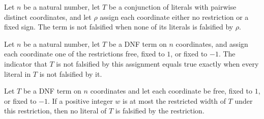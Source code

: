 \begin{definition}
\label{FABL.DNFTerm.notFalsified}
\leanok
{}
Let $n$ be a natural number, let $T$ be a conjunction of literals with pairwise distinct
coordinates, and let $\rho$ assign each coordinate either no restriction or a fixed
sign. The term is not falsified when none of its literals is falsified by $\rho$.
\end{definition}

\begin{theorem}
\label{FABL.DNFTerm.notFalsified_iff}
\leanok
{}
Let $n$ be a natural number, let $T$ be a DNF term on $n$ coordinates, and assign each
coordinate one of the restrictions free, fixed to $1$, or fixed to $-1$. The indicator
that $T$ is not falsified by this assignment equals true exactly when every literal in
$T$ is not falsified by it.
\end{theorem}

\begin{theorem}
\label{FABL.DNFTerm.restrictedWidthOf_ge_implies_notFalsified}
\leanok
{}
Let $T$ be a DNF term on $n$ coordinates and let each coordinate be free, fixed to $1$,
or fixed to $-1$. If a positive integer $w$ is at most the restricted width of $T$ under
this restriction, then no literal of $T$ is falsified by the restriction.
\end{theorem}

